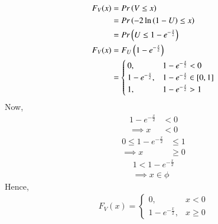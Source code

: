 \documentclass[journal,12pt,twocolumn]{IEEEtran}
\renewcommand\thesection{\arabic{section}}
\begin{document}
\begin{enumerate}[label=\thesection.\arabic*
,ref=\thesection.\theenumi]
\begin{align}
    F_V(x) &= Pr\left(V \leq x\right) \\
    &= Pr\left(-2 \ln \left(1-U\right) \leq x\right) \\
    &= Pr\left(U \leq 1 - e^{-\frac{x}{2}}\right) \\
    F_V(x) &= F_U\left(1 - e^{-\frac{x}{2}}\right) \\
    &= \begin{cases}
    0, & 1 - e^{-\frac{x}{2}}< 0 \\
    1 - e^{-\frac{x}{2}}, & 1 - e^{-\frac{x}{2}}\in [0,1] \\
    1, & 1 - e^{-\frac{x}{2}}> 1
    \end{cases}
\end{align}
Now,
\begin{align}
    1 - e^{-\frac{x}{2}} &< 0 \\
    \implies x &<0
\end{align}
\begin{align}
    0\leq1 - e^{-\frac{x}{2}} &\leq1 \\
    \implies x &\geq0
\end{align}
\begin{align}
    1<1 - e^{-\frac{x}{2}} \\
    \implies x \in \phi
\end{align}
Hence,
\begin{align}
    F_V(x) = \begin{cases}
    0, & x<0\\
    1 - e^{-\frac{x}{2}}, & x\geq0
    \end{cases}
\end{align}
%
\end{enumerate}
\end{document}
